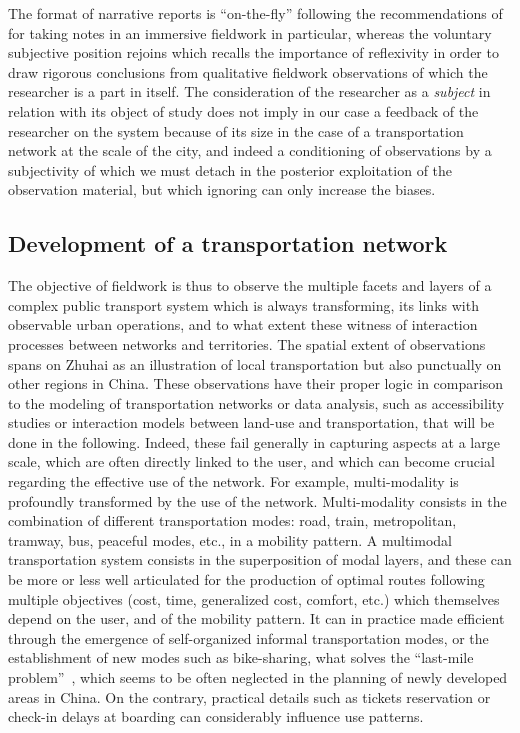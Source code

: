  The format of narrative reports is ``on-the-fly'' following the recommendations of \cite{goffman1989fieldwork} for taking notes in an immersive fieldwork in particular, whereas the voluntary subjective position rejoins \cite{ball1990self} which recalls the importance of reflexivity in order to draw rigorous conclusions from qualitative fieldwork observations of which the researcher is a part in itself. The consideration of the researcher as a \emph{subject} in relation with its object of study does not imply in our case a feedback of the researcher on the system because of its size in the case of a transportation network at the scale of the city, and indeed a conditioning of observations by a subjectivity of which we must detach in the posterior exploitation of the observation material, but which ignoring can only increase the biases.


\subsection{Development of a transportation network}

The objective of fieldwork is thus to observe the multiple facets and layers of a complex public transport system which is always transforming, its links with observable urban operations, and to what extent these witness of interaction processes between networks and territories. The spatial extent of observations spans on Zhuhai as an illustration of local transportation but also punctually on other regions in China. These observations have their proper logic in comparison to the modeling of transportation networks or data analysis, such as accessibility studies or interaction models between land-use and transportation, that will be done in the following. Indeed, these fail generally in capturing aspects at a large scale, which are often directly linked to the user, and which can become crucial regarding the effective use of the network. For example, multi-modality is profoundly transformed by the use of the network. Multi-modality consists in the combination of different transportation modes: road, train, metropolitan, tramway, bus, peaceful modes, etc., in a mobility pattern. A multimodal transportation system consists in the superposition of modal layers, and these can be more or less well articulated for the production of optimal routes following multiple objectives (cost, time, generalized cost, comfort, etc.) which themselves depend on the user, and of the mobility pattern. It can in practice made efficient through the emergence of self-organized informal transportation modes, or the establishment of new modes such as bike-sharing, what solves the ``last-mile problem''~\cite{liu2012solving}, which seems to be often neglected in the planning of newly developed areas in China. On the contrary, practical details such as tickets reservation or check-in delays at boarding can considerably influence use patterns.

